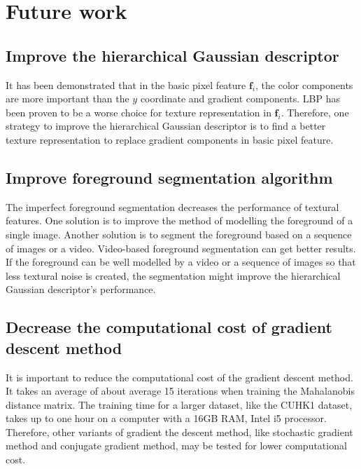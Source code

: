 \section{Future work}
\subsection{Improve the hierarchical Gaussian descriptor}
It has been demonstrated that in the basic pixel feature $\bm{f}_i$, the color components are more important than the $y$ coordinate and gradient components. LBP has been proven to be a worse choice for texture representation in $\bm{f}_i$. Therefore, one strategy to improve the hierarchical Gaussian descriptor is to find a better texture representation to replace gradient components in basic pixel feature. 
\subsection{Improve foreground segmentation algorithm}
The imperfect foreground segmentation decreases the performance of textural features. One solution is to improve the method of modelling the foreground of a single image. Another solution is to segment the foreground based on a sequence of images or a video. Video-based foreground segmentation can get better results. If the foreground can be well modelled by a video or a sequence of images so that less textural noise is created, the segmentation might improve the hierarchical Gaussian descriptor's performance.
\subsection{Decrease the computational cost of gradient descent method}
It is important to reduce the computational cost of the gradient descent method. It takes an average of about average 15 iterations when training the Mahalanobis distance matrix. The training time for a larger dataset, like the CUHK1 dataset, takes up to one hour on a computer with a 16GB RAM, Intel i5 processor. Therefore, other variants of gradient the descent method, like stochastic gradient method and conjugate gradient method, may be tested for lower computational cost.



